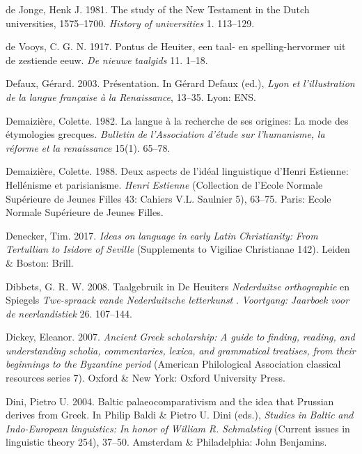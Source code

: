 \documentclass[output=paper]{langsci/langscibook}
\begin{document}
de Jonge, Henk J. 1981. The study of the New Testament in the Dutch universities, 1575–1700. \textit{History} \textit{of} \textit{universities} 1. 113–129.

de Vooys, C. G. N. 1917. Pontus de Heuiter, een taal- en spelling-hervormer uit de zestiende eeuw. \textit{De} \textit{nieuwe} \textit{taalgids} 11. 1–18.

Defaux, Gérard. 2003. Présentation. In Gérard Defaux (ed.), \textit{Lyon} \textit{et} \textit{l’illustration} \textit{de} \textit{la} \textit{langue} \textit{française} \textit{à} \textit{la} \textit{Renaissance}, 13–35. Lyon: ENS.

Demaizière, Colette. 1982. La langue à la recherche de ses origines: La mode des étymologies grecques. \textit{Bulletin} \textit{de} \textit{l’Association} \textit{d’étude} \textit{sur} \textit{l’humanisme,} \textit{la} \textit{réforme} \textit{et} \textit{la} \textit{renaissance} 15(1). 65–78.

Demaizière, Colette. 1988. Deux aspects de l’idéal linguistique d’Henri Estienne: Hellénisme et parisianisme. \textit{Henri} \textit{Estienne} (Collection de l’Ecole Normale Supérieure de Jeunes Filles 43: Cahiers V.L. Saulnier 5), 63–75. Paris: Ecole Normale Supérieure de Jeunes Filles.

Denecker, Tim. 2017. \textit{Ideas} \textit{on} \textit{language} \textit{in} \textit{early} \textit{Latin} \textit{Christianity:} \textit{From} \textit{Tertullian} \textit{to} \textit{Isidore} \textit{of} \textit{Seville} (Supplements to Vigiliae Christianae 142). Leiden \& Boston: Brill.

Dibbets, G. R. W. 2008. Taalgebruik in De Heuiters \textit{Nederduitse} \textit{orthographie}  en Spiegels \textit{Twe-spraack} \textit{vande} \textit{Nederduitsche} \textit{letterkunst} . \textit{Voortgang:} \textit{Jaarboek} \textit{voor} \textit{de} \textit{neerlandistiek} 26. 107–144.

Dickey, Eleanor. 2007. \textit{Ancient} \textit{Greek} \textit{scholarship:} \textit{A} \textit{guide} \textit{to} \textit{finding,} \textit{reading,} \textit{and} \textit{understanding} \textit{scholia,} \textit{commentaries,} \textit{lexica,} \textit{and} \textit{grammatical} \textit{treatises,} \textit{from} \textit{their} \textit{beginnings} \textit{to} \textit{the} \textit{Byzantine} \textit{period} (American Philological Association classical resources series 7). Oxford \& New York: Oxford University Press.

Dini, Pietro U. 2004. Baltic palaeocomparativism and the idea that Prussian derives from Greek. In Philip Baldi \& Pietro U. Dini (eds.), \textit{Studies} \textit{in} \textit{Baltic} \textit{and} \textit{Indo-European} \textit{linguistics:} \textit{In} \textit{honor} \textit{of} \textit{William} \textit{R.} \textit{Schmalstieg} (Current issues in linguistic theory 254), 37–50. Amsterdam \& Philadelphia: John Benjamins.
\end{document}
